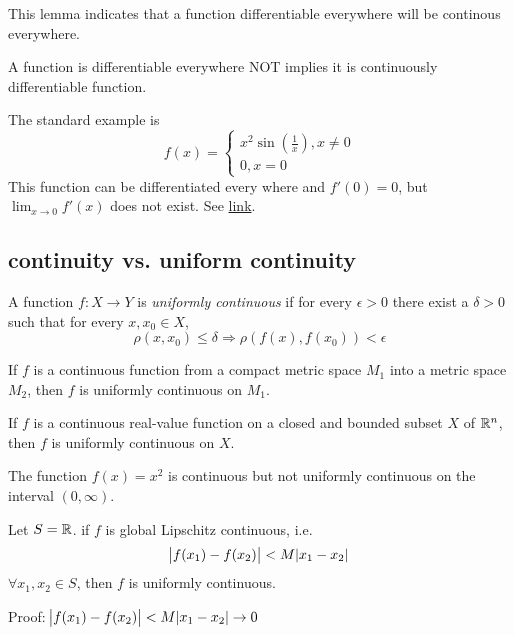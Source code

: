 \begin{refsection}
\begin{remark}
This lemma indicates that a function differentiable everywhere will be continous everywhere.
\end{remark}

\begin{lemma}
A function is differentiable everywhere NOT implies it is continuously differentiable function.
\end{lemma}
The standard example is
$$f(x) = \begin{cases} x^2\sin(\frac{1}{x}),x\neq 0\\
0,x=0 \end{cases}$$
This function can be differentiated every where and $f'(0) = 0$, but $\lim_{x\to 0} f'(x) $ does not exist. See \href{http://math.stackexchange.com/questions/724716/does-a-differentiable-everywhere-function-have-a-continuous-derivative}{link}.


\subsection{continuity vs. uniform continuity}
\begin{definition}
A function $f:X\rightarrow Y$ is \emph{uniformly continuous} if for every $\epsilon > 0$ there exist a $\delta > 0$ such that for every $x,x_0 \in X$,
$$\rho(x,x_0) \leq \delta \Rightarrow \rho(f(x),f(x_0)) < \epsilon $$
\end{definition}


\begin{theorem}
\cite[154]{johnsonbaugh2010foundations} If $f$ is a continuous function from a compact metric space $M_1$ into a metric space $M_2$, then $f$ is uniformly continuous on $M_1$.
\end{theorem}

\begin{corollary}\cite[154]{johnsonbaugh2010foundations}
If $f$ is a continuous real-value function on a closed and bounded subset $X$ of $\mathbb{R}^n$, then $f$ is uniformly continuous on $X$.
\end{corollary}

\begin{example}
The function $f(x)=x^2$ is continuous but not uniformly continuous on the interval $(0,\infty)$.
\end{example}

\begin{lemma}
Let $S=\mathbb{R}$. if $f$ is global Lipschitz continuous, i.e.
$$\abs{f(x_1)-f(x_2)} < M \abs{x_1-x_2}$$
$\forall x_1,x_2 \in S$, then $f$ is uniformly continuous.
\end{lemma}
Proof: $\abs{f(x_1)-f(x_2)} < M \abs{x_1-x_2} \to 0$



\end{refsection}
